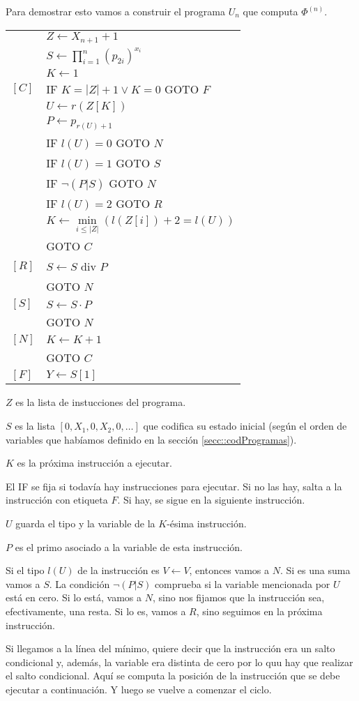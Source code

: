 \begin{demo}
	Para demostrar esto vamos a construir el programa $U_n$ que computa $\Phi^{(n)}$.
	\begin{multicols}{2}
			\begin{tabular}{ll}
				&$Z\leftarrow X_{n+1} +1$ \\
				&$S \leftarrow \prod\limits_{i=1}^{n} (p_{2i})^{x_i}$ \\
				&$K \leftarrow 1$\\
				$[C]$ & IF $K = |Z| + 1 \lor K = 0$ GOTO $F$ \\
				&$U \leftarrow r(Z[K])$ \\
				&$P \leftarrow p_{r(U)+1}$\\
				& IF $l(U) = 0$ GOTO $N$ \\
				& IF $l(U) = 1$ GOTO $S$ \\
				& IF $\lnot (P | S)$ GOTO $N$ \\
				& IF $l(U) = 2$ GOTO $R$ \\
				&$K \leftarrow \min\limits_{i\leq |Z|}(l(Z[i]) + 2 = l(U))$\\
				& GOTO $C$ \\
				$[R]$ & $S \leftarrow S$ div $P$ \\
				& GOTO $N$ \\
				$[S]$ & $S \leftarrow S\cdot P$ \\
				& GOTO $N$ \\
				$[N]$ & $K\leftarrow K + 1$ \\
				& GOTO $C$ \\
				$[F]$ & $Y \leftarrow S[1]$ \\
			\end{tabular}
		\vfill\null
	\columnbreak
	$Z$ es la lista de instucciones del programa.
	
	$S$ es la lista $[0,X_1,0,X_2,0,\dots]$ que codifica su estado inicial (según el orden de variables que habíamos definido en la sección \ref{secc::codProgramas}).
	
	$K$ es la próxima instrucción a ejecutar. 

	El IF se fija si todavía hay instrucciones para ejecutar. Si no las hay, salta a la instrucción con etiqueta $F$. Si hay, se sigue en la siguiente instrucción.
	
	$U$ guarda el tipo y la variable de la $K$-ésima instrucción.
	
	$P$ es el primo asociado a la variable de esta instrucción.
	
	Si el tipo $l(U)$ de la instrucción es $V\leftarrow V$, entonces vamos a $N$. Si es una suma vamos a $S$. La condición $\lnot(P|S)$ comprueba si la variable mencionada por $U$ está en cero. Si lo está, vamos a $N$, sino nos fijamos que la instrucción sea, efectivamente, una resta. Si lo es, vamos a $R$, sino seguimos en la próxima instrucción.
	\end{multicols}
Si llegamos a la línea del mínimo, quiere decir que la instrucción era un salto condicional y, además, la variable era distinta de cero por lo quu hay que realizar el salto condicional. Aquí se computa la posición de la instrucción que se debe ejecutar a continuación. Y luego se vuelve a comenzar el ciclo.
\end{demo}
